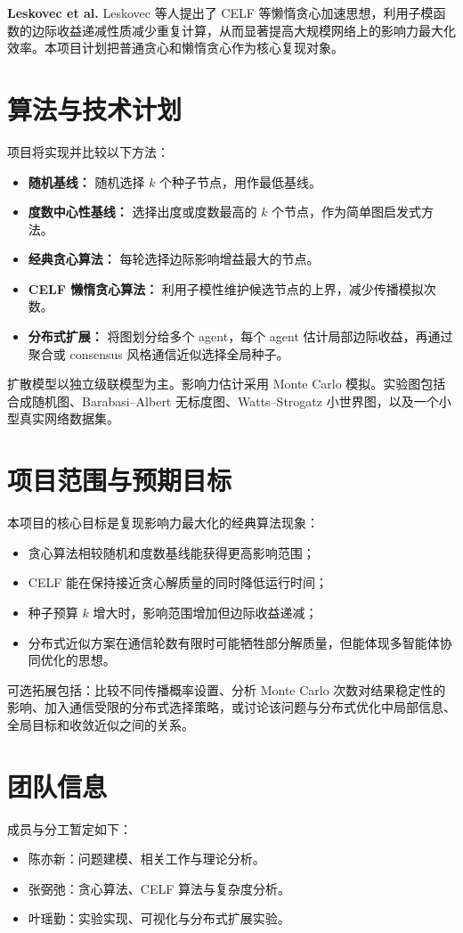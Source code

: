 \documentclass[UTF8, 11pt]{ctexart}
\begin{document}
\textbf{Leskovec et al.}
Leskovec 等人提出了 CELF 等懒惰贪心加速思想，利用子模函数的边际收益递减性质减少重复计算，从而显著提高大规模网络上的影响力最大化效率。本项目计划把普通贪心和懒惰贪心作为核心复现对象。

\section{算法与技术计划}

项目将实现并比较以下方法：
\begin{itemize}
    \item \textbf{随机基线：} 随机选择 $k$ 个种子节点，用作最低基线。
    \item \textbf{度数中心性基线：} 选择出度或度数最高的 $k$ 个节点，作为简单图启发式方法。
    \item \textbf{经典贪心算法：} 每轮选择边际影响增益最大的节点。
    \item \textbf{CELF 懒惰贪心算法：} 利用子模性维护候选节点的上界，减少传播模拟次数。
    \item \textbf{分布式扩展：} 将图划分给多个 agent，每个 agent 估计局部边际收益，再通过聚合或 consensus 风格通信近似选择全局种子。
\end{itemize}

扩散模型以独立级联模型为主。影响力估计采用 Monte Carlo 模拟。实验图包括合成随机图、Barabasi--Albert 无标度图、Watts--Strogatz 小世界图，以及一个小型真实网络数据集。

\section{项目范围与预期目标}

本项目的核心目标是复现影响力最大化的经典算法现象：
\begin{itemize}
    \item 贪心算法相较随机和度数基线能获得更高影响范围；
    \item CELF 能在保持接近贪心解质量的同时降低运行时间；
    \item 种子预算 $k$ 增大时，影响范围增加但边际收益递减；
    \item 分布式近似方案在通信轮数有限时可能牺牲部分解质量，但能体现多智能体协同优化的思想。
\end{itemize}

可选拓展包括：比较不同传播概率设置、分析 Monte Carlo 次数对结果稳定性的影响、加入通信受限的分布式选择策略，或讨论该问题与分布式优化中局部信息、全局目标和收敛近似之间的关系。

\section{团队信息}

成员与分工暂定如下：
\begin{itemize}
    \item 陈亦新：问题建模、相关工作与理论分析。
    \item 张弼弛：贪心算法、CELF 算法与复杂度分析。
    \item 叶瑶勤：实验实现、可视化与分布式扩展实验。
\end{itemize}
\end{document}
